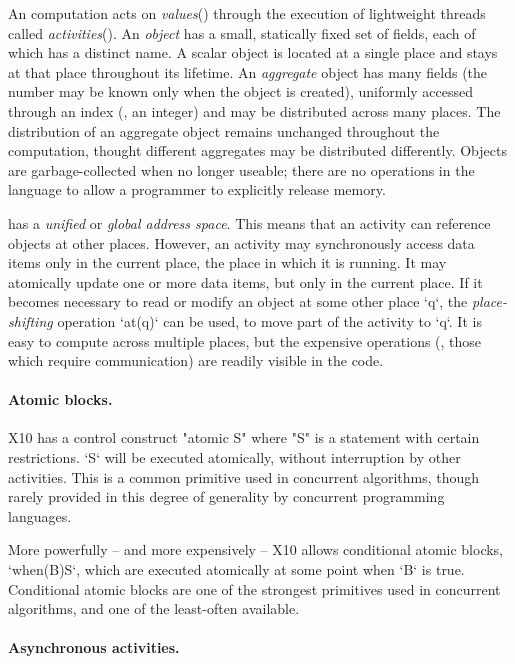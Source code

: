 An \Xten{} computation acts on \emph{values}() through
the execution of lightweight threads called
\emph{activities}(). 
An {\em object}
 has a small, statically fixed set of fields, each of
which has a distinct name. A scalar object is located at a single place and
stays at that place throughout its lifetime. An \emph{aggregate} object has
many fields (the number may be known only when the object is created),
uniformly accessed through an index (\eg, an integer) and may be distributed
across many places. The distribution of an aggregate object remains unchanged
throughout the computation, thought different aggregates may be distributed
differently. Objects are garbage-collected when no longer useable; there are
no operations in the language to allow a programmer to explicitly release
memory.

{}\Xten{} has a \emph{unified} or \emph{global address space}. This means that
an activity can reference objects at other places. However, an activity may
synchronously access data items only in the current place, the place in which
it is running. It may atomically update one or more data items, but only in
the current place.   If it becomes necessary to read or modify an object at
some other place \xcd`q`, the {\em place-shifting} operation \xcd`at(q)` can
be used, to move part of the activity to \xcd`q`.   It is easy to compute
across multiple places, but the expensive operations (\eg, those which require
communication) are readily visible in the code. 

\paragraph{Atomic blocks.}

X10 has a control construct \xcd"atomic S" where \xcd"S" is a statement with
certain restrictions. \xcd`S` will be executed atomically, without
interruption by other activities. This is a common primitive used in
concurrent algorithms, though rarely provided in this degree of generality by
concurrent programming languages.

More powerfully -- and more expensively -- X10 allows conditional atomic
blocks, \xcd`when(B)S`, which are executed atomically at some point when
\xcd`B` is true.  Conditional atomic blocks are one of the strongest
primitives used in concurrent algorithms, and one of the least-often
available. 

\paragraph{Asynchronous activities.}

